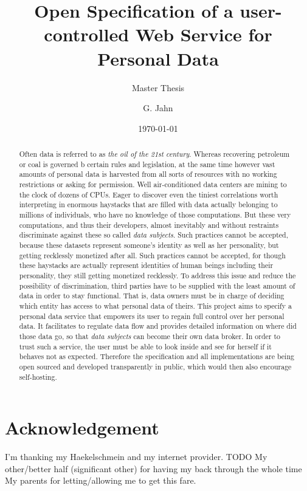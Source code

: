 \documentclass[12pt,english,a4paper,titlepage,cleardoublepage=empty,dottedtoc]{report}
\title{Open Specification of a user-controlled Web Service for Personal Data}
\subtitle{Master Thesis}
\author{G. Jahn}
\date{\today}
\begin{document}
\maketitle
\begin{abstract}
Often data is referred to as \emph{the oil of the 21st century}. Whereas
recovering petroleum or coal is governed b certain rules and
legislation, at the same time however vast amounts of personal data is
harvested from all sorts of resources with no working restrictions or
asking for permission. Well air-conditioned data centers are mining to
the clock of dozens of CPUs. Eager to discover even the tiniest
correlations worth interpreting in enormous haystacks that are filled
with data actually belonging to millions of individuals, who have no
knowledge of those computations. But these very computations, and thus
their developers, almost inevitably and without restraints discriminate
against these so called \emph{data subjects}. Such practices cannot be
accepted, because these datasets represent someone's identity as well as
her personality, but getting recklessly monetized after all. Such
practices cannot be accepted, for though these haystacks are actually
represent identities of human beings including their personality, they
still getting monetized recklessly. To address this issue and reduce the
possibility of discrimination, third parties have to be supplied with
the least amount of data in order to stay functional. That is, data
owners must be in charge of deciding which entity has access to what
personal data of theirs. This project aims to specify a personal data
service that empowers its user to regain full control over her personal
data. It facilitates to regulate data flow and provides detailed
information on where did those data go, so that \emph{data subjects} can
become their own data broker. In order to trust such a service, the user
must be able to look inside and see for herself if it behaves not as
expected. Therefore the specification and all implementations are being
open sourced and developed transparently in public, which would then
also encourage self-hosting.
\end{abstract}

\section*{Acknowledgement}
I'm thanking my Haekelschmein and my internet provider. TODO My
other/better half (significant other) for having my back through the
whole time My parents for letting/allowing me to get this fare.
\newpage
\end{document}
